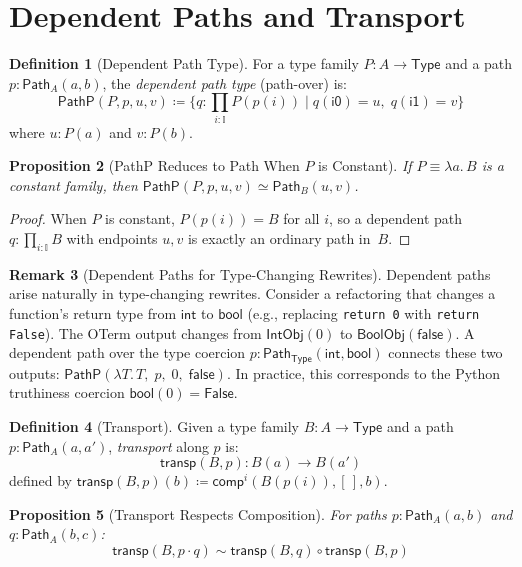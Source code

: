 \documentclass[11pt,a4paper]{report}
\theoremstyle{definition}
\newtheorem{definition}{Definition}[chapter]
\newtheorem{remark}[definition]{Remark}
\theoremstyle{plain}
\newtheorem{proposition}[definition]{Proposition}
\newcommand{\Path}{\mathsf{Path}}
\newcommand{\Type}{\mathsf{Type}}
\newcommand{\interval}{\mathbb{I}}
\newcommand{\transp}{\mathsf{transp}}
\newcommand{\comp}{\mathsf{comp}}
\begin{document}
\section{Dependent Paths and Transport}

\begin{definition}[Dependent Path Type]
\label{def:dep-path}
For a type family $P : A \to \Type$ and a path $p : \Path_A(a, b)$,
the \emph{dependent path type} (path-over) is:
\[
  \mathsf{PathP}(P, p, u, v) \coloneqq \{q : \prod_{i : \interval} P(p(i))
  \mid q(\mathsf{i0}) = u,\; q(\mathsf{i1}) = v\}
\]
where $u : P(a)$ and $v : P(b)$.
\end{definition}

\begin{proposition}[PathP Reduces to Path When $P$ is Constant]
\label{prop:pathp-constant}
If $P \equiv \lambda a.\, B$ is a constant family, then
$\mathsf{PathP}(P, p, u, v) \simeq \Path_B(u, v)$.
\end{proposition}

\begin{proof}
When $P$ is constant, $P(p(i)) = B$ for all $i$, so a dependent path
$q : \prod_{i : \interval} B$ with endpoints $u, v$ is exactly an
ordinary path in~$B$.
\end{proof}

\begin{remark}[Dependent Paths for Type-Changing Rewrites]
\label{rem:dep-path-impl}
Dependent paths arise naturally in type-changing rewrites.  Consider a
refactoring that changes a function's return type from
$\mathsf{int}$ to $\mathsf{bool}$ (e.g., replacing
\texttt{return 0} with \texttt{return False}).  The OTerm output
changes from $\mathsf{IntObj}(0)$ to $\mathsf{BoolObj}(\mathsf{false})$.
A dependent path over the type coercion $p : \Path_\Type(\mathsf{int},
\mathsf{bool})$ connects these two outputs:
$\mathsf{PathP}(\lambda T.\, T,\; p,\; 0,\; \mathsf{false})$.
In practice, this corresponds to the Python truthiness coercion
$\mathsf{bool}(0) = \mathsf{False}$.
\end{remark}

\begin{definition}[Transport]
\label{def:transport}
Given a type family $B : A \to \Type$ and a path $p : \Path_A(a, a')$,
\emph{transport} along $p$ is:
\[
  \transp(B, p) : B(a) \to B(a')
\]
defined by $\transp(B, p)(b) \coloneqq \comp^i(B(p(i)), [\,], b)$.
\end{definition}

\begin{proposition}[Transport Respects Composition]
\label{prop:transport-comp}
For paths $p : \Path_A(a, b)$ and $q : \Path_A(b, c)$:
\[
  \transp(B, p \cdot q) \sim \transp(B, q) \circ \transp(B, p)
\]
\end{proposition}
\end{document}
